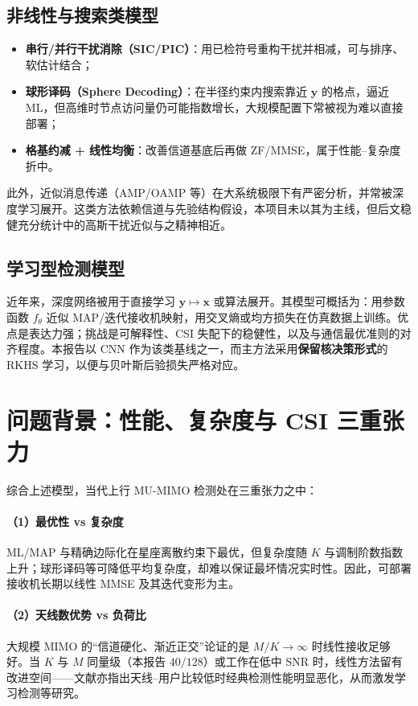 \subsection{非线性与搜索类模型}
\begin{itemize}
  \item \textbf{串行/并行干扰消除（SIC/PIC）}：用已检符号重构干扰并相减，可与排序、软估计结合；
  \item \textbf{球形译码（Sphere Decoding）}：在半径约束内搜索靠近 $\mathbf{y}$ 的格点，逼近 ML，但高维时节点访问量仍可能指数增长\cite{hassibi2005,studer2011}，大规模配置下常被视为难以直接部署\cite{larsson2014}；
  \item \textbf{格基约减 + 线性均衡}：改善信道基底后再做 ZF/MMSE，属于性能--复杂度折中。
\end{itemize}
此外，近似消息传递（AMP/OAMP 等）在大系统极限下有严密分析，并常被深度学习展开\cite{he2018}。这类方法依赖信道与先验结构假设，本项目未以其为主线，但后文稳健充分统计中的高斯干扰近似与之精神相近。

\subsection{学习型检测模型}
近年来，深度网络被用于直接学习 $\mathbf{y}\mapsto\mathbf{x}$ 或算法展开\cite{samuel2019,o2017,khani2020}。其模型可概括为：用参数函数 $f_\theta$ 近似 MAP/迭代接收机映射，用交叉熵或均方损失在仿真数据上训练。优点是表达力强；挑战是可解释性、CSI 失配下的稳健性，以及与通信最优准则的对齐程度。本报告以 CNN 作为该类基线之一，而主方法采用\textbf{保留核决策形式}的 RKHS 学习，以便与贝叶斯后验损失严格对应。

\section{问题背景：性能、复杂度与 CSI 三重张力}

综合上述模型，当代上行 MU-MIMO 检测处在三重张力之中：

\paragraph{（1）最优性 vs 复杂度}
ML/MAP 与精确边际化在星座离散约束下最优，但复杂度随 $K$ 与调制阶数指数上升；球形译码等可降低平均复杂度，却难以保证最坏情况实时性。因此，可部署接收机长期以线性 MMSE 及其迭代变形为主。

\paragraph{（2）天线数优势 vs 负荷比}
大规模 MIMO 的“信道硬化、渐近正交”论证的是 $M/K\to\infty$ 时线性接收足够好\cite{marzetta2010,hoydis2013}。当 $K$ 与 $M$ 同量级（本报告 $40/128$）或工作在低中 SNR 时，线性方法留有改进空间——文献亦指出天线--用户比较低时经典检测性能明显恶化，从而激发学习检测等研究\cite{khani2020}。

